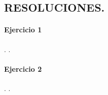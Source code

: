\documentclass{article}
\begin{document}


\begin{center}
\section*{RESOLUCIONES.}
\end{center}
\paragraph{Ejercicio 1}.
.
\paragraph{Ejercicio 2}.
.
\end{document}

